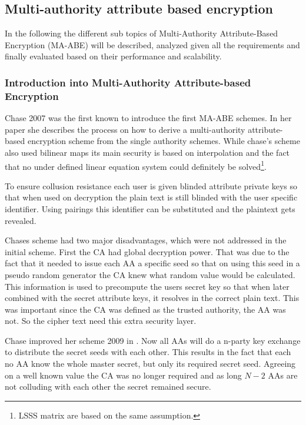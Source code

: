 \subsection{Multi-authority attribute based encryption}
In the following the different sub topics of Multi-Authority Attribute-Based Encryption (\ac{MA-ABE}) will be described, analyzed given all the requirements and finally evaluated based on their performance and scalability. 

\subsubsection{Introduction into Multi-Authority Attribute-based Encryption}
Chase 2007 \cite{chase2007multi} was the first known to introduce the first \ac{MA-ABE} schemes. In her paper she describes the process on how to derive a multi-authority attribute-based encryption scheme from the single authority schemes. While chase's scheme also used bilinear maps its main security is based on interpolation and the fact that no under defined linear equation system could definitely be solved\footnote{\ac{LSSS} matrix are based on the same assumption.}.  

To ensure collusion resistance each user is given blinded attribute private keys so that when used on decryption the plain text is still blinded with the user specific identifier. Using pairings this identifier can be substituted and the plaintext gets revealed. 

Chases scheme had two major disadvantages, which were not addressed in the initial scheme. First the \ac{CA} had global decryption power. That was due to the fact that it needed to issue each \ac{AA} a specific seed so that on using this seed in a pseudo random generator the \ac{CA} knew what random value would be calculated. This information is used to precompute the users secret key so that when later combined with the secret attribute keys, it resolves in the correct plain text. This was important since the CA was defined as the trusted authority, the AA was not. So the cipher text need this extra security layer.  

Chase improved her scheme 2009 in \cite{chase2009improving}. Now all \ac{AA}s will do a n-party key exchange to distribute the secret seeds with each other. This results in the fact that each no AA know the whole master secret, but only its required secret seed. Agreeing on a well known value the \ac{CA} was no longer required and as long $N-2$ \ac{AA}s are not colluding with each other the secret remained secure. 

